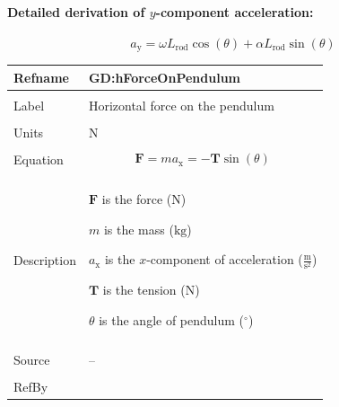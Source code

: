\documentclass[12pt]{article}
\begin{document}
\paragraph{Detailed derivation of $y$-component acceleration:}
\label{GD:accelerationIYDeriv}
\begin{displaymath}
{a_{\text{y}}}=ω {L_{\text{rod}}} \cos\left(θ\right)+α {L_{\text{rod}}} \sin\left(θ\right)
\end{displaymath}
\vspace{\baselineskip}
\noindent
\begin{minipage}{\textwidth}
\begin{tabular}{>{\raggedright}p{}>{\raggedright\arraybackslash}p{}}
\toprule \textbf{Refname} & \textbf{GD:hForceOnPendulum}
\label{GD:hForceOnPendulum}
\\ \midrule \\
Label & Horizontal force on the pendulum
        
\\ \midrule \\
Units & ${\text{N}}$
        
\\ \midrule \\
Equation & \begin{displaymath}
           \mathbf{F}=m {a_{\text{x}}}=-\mathbf{T} \sin\left(θ\right)
           \end{displaymath}
\\ \midrule \\
Description & \begin{symbDescription}
              \item{$\mathbf{F}$ is the force (${\text{N}}$)}
              \item{$m$ is the mass (${\text{kg}}$)}
              \item{${a_{\text{x}}}$ is the $x$-component of acceleration ($\frac{\text{m}}{\text{s}^{2}}$)}
              \item{$\mathbf{T}$ is the tension (${\text{N}}$)}
              \item{$θ$ is the angle of pendulum (${{}^{\circ}}$)}
              \end{symbDescription}
\\ \midrule \\
Source & --
         
\\ \midrule \\
RefBy & 
\\ \bottomrule
\end{tabular}
\end{minipage}
\end{document}
